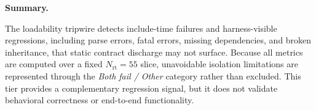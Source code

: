 \vspace{0.25em}
\noindent\textbf{Summary.}\par
The loadability tripwire detects include-time failures and harness-visible regressions, including parse errors, fatal errors, missing dependencies, and broken inheritance, that static contract discharge may not surface.
Because all metrics are computed over a fixed $N_{\mathrm{rt}}=55$ slice, unavoidable isolation limitations are represented through the \emph{Both fail / Other} category rather than excluded.
This tier provides a complementary regression signal, but it does not validate behavioral correctness or end-to-end functionality.